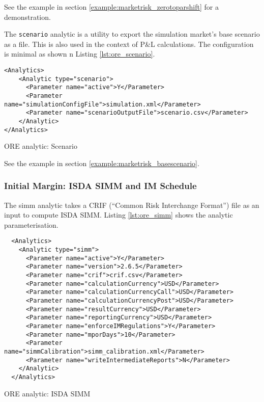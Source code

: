 {See the example in section \ref{example:marketrisk_zerotoparshift} for a demonstration.

\medskip

The {\tt scenario} analytic is a utility to export the simulation market's base scenario as a file.
This is also used in the context of P\&L calculations. The configuration is minimal as shown
n Listing \ref{lst:ore_scenario}.

\begin{listing}[H]
\begin{verbatim}
<Analytics>
    <Analytic type="scenario">
      <Parameter name="active">Y</Parameter>
      <Parameter name="simulationConfigFile">simulation.xml</Parameter>
      <Parameter name="scenarioOutputFile">scenario.csv</Parameter>
    </Analytic>
</Analytics>
\end{verbatim}
\caption{ORE analytic: Scenario}
\label{lst:ore_scenario}
\end{listing}

See the example in section \ref{example:marketrisk_basescenario}.

\subsubsection{Initial Margin: ISDA SIMM and IM Schedule}

The simm analytic takes a CRIF (``Common Risk Interchange Format'') file as an input to compute
ISDA SIMM. Listing \ref{lst:ore_simm} shows the analytic parameterisation.

\begin{listing}[H]
\begin{verbatim}
  <Analytics>
    <Analytic type="simm">
      <Parameter name="active">Y</Parameter>
      <Parameter name="version">2.6.5</Parameter>
      <Parameter name="crif">crif.csv</Parameter>
      <Parameter name="calculationCurrency">USD</Parameter>
      <Parameter name="calculationCurrencyCall">USD</Parameter>
      <Parameter name="calculationCurrencyPost">USD</Parameter>
      <Parameter name="resultCurrency">USD</Parameter>
      <Parameter name="reportingCurrency">USD</Parameter>
      <Parameter name="enforceIMRegulations">Y</Parameter>
      <Parameter name="mporDays">10</Parameter>
      <Parameter name="simmCalibration">simm_calibration.xml</Parameter>
      <Parameter name="writeIntermediateReports">N</Parameter>
    </Analytic>
  </Analytics>
\end{verbatim}
\caption{ORE analytic: ISDA SIMM}
\label{lst:ore_simm}
\end{listing}

}
